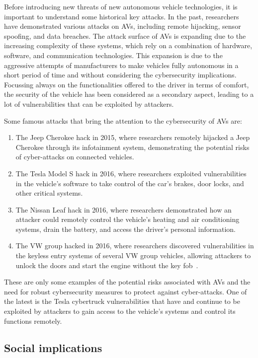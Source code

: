 Before introducing new threats of new autonomous vehicle technologies, it is important to understand some historical key attacks.
In the past, researchers have demonstrated various attacks on AVs, including remote hijacking, sensor spoofing, and data breaches.
The attack surface of AVs is expanding due to the increasing complexity of these systems, which rely on a combination of hardware, software, and communication technologies\cite{cybersec}.
This expansion is due to the aggressive attempts of manufacturers to
make vehicles fully autonomous in a short period of time and without considering the cybersecurity implications.
Focussing always on the functionalities offered to the driver in terms of comfort, the security of the vehicle has been considered as a secondary aspect, leading to a lot of vulnerabilities that can be exploited by attackers.

Some famous attacks that bring the attention to the cybersecurity of AVs are:
\begin{enumerate}
    \item The Jeep Cherokee hack in 2015, where researchers remotely hijacked a Jeep Cherokee through its infotainment system, demonstrating the potential risks of cyber-attacks on connected vehicles\cite{miller2015remote}.
    \item The Tesla Model S hack in 2016, where researchers exploited vulnerabilities in the vehicle's software to take control of the car's brakes, door locks, and other critical systems\cite{tesla_hack}.
    \item The Nissan Leaf hack in 2016, where researchers demonstrated how an attacker could remotely control the vehicle's heating and air conditioning systems, drain the battery, and access the driver's personal information.
    \item The VW group hacked in 2016, where researchers discovered vulnerabilities in the keyless entry systems of several VW group vehicles, allowing attackers to unlock the doors and start the engine without the key fob~\cite{garcia2016lock}.
\end{enumerate}

These are only some examples of the potential risks associated with AVs and the need for robust cybersecurity measures to protect against cyber-attacks.
One of the latest is the Tesla cybertruck vulnerabilities that have and continue to be exploited by attackers to gain access to the vehicle's systems and control its functions remotely.

\subsection{Social implications}\label{subsec:social-implications}

